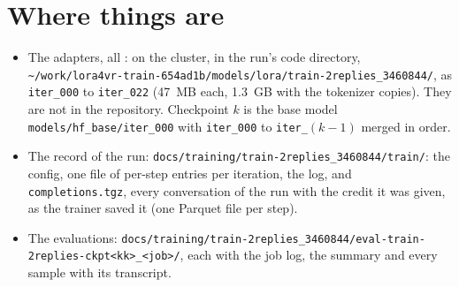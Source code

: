 \documentclass[11pt,a4paper]{article}
\begin{document}
\section{Where things are}

\begin{sloppypar}
\begin{itemize}[leftmargin=*, itemsep=0.2em]
\item The adapters, all \TRiterations: on the cluster, in the run's code
  directory,
  \nolinkurl{~/work/lora4vr-train-654ad1b/models/lora/train-2replies_3460844/},
  as \texttt{iter\_000} to \texttt{iter\_022} (47~MB each, 1.3~GB with the
  tokenizer copies). They are not in the repository. Checkpoint $k$ is the
  base model \texttt{models/hf\_base/iter\_000} with \texttt{iter\_000} to
  \texttt{iter\_$(k{-}1)$} merged in order.
\item The record of the run:
  \nolinkurl{docs/training/train-2replies_3460844/train/}: the config, one
  file of per-step entries per iteration, the log, and
  \texttt{completions.tgz}, every conversation of the run with the credit
  it was given, as the trainer saved it (one Parquet file per step).
\item The evaluations:
  \nolinkurl{docs/training/train-2replies_3460844/eval-train-2replies-ckpt<kk>_<job>/},
  each with the job log, the summary and every sample with its transcript.
\end{itemize}
\end{sloppypar}
\end{document}
